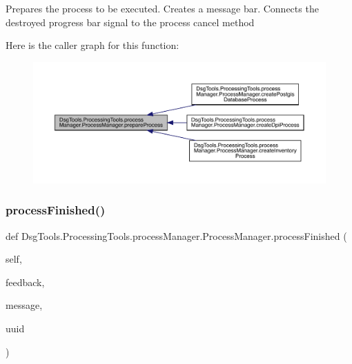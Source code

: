 \begin{DoxyVerb}Prepares the process to be executed.
Creates a message bar.
Connects the destroyed progress bar signal to the process cancel method
\end{DoxyVerb}
 Here is the caller graph for this function\+:
\nopagebreak
\begin{figure}[H]
\begin{center}
\leavevmode
\includegraphics[width=350pt]{class_dsg_tools_1_1_processing_tools_1_1process_manager_1_1_process_manager_a314d0e639c22ed78d70c63a6740a5337_icgraph}
\end{center}
\end{figure}
\mbox{\label{class_dsg_tools_1_1_processing_tools_1_1process_manager_1_1_process_manager_a3054cb26b2103882257b1d2008bec546}} 
\subsubsection{\texorpdfstring{process\+Finished()}{processFinished()}}
{\footnotesize\ttfamily def Dsg\+Tools.\+Processing\+Tools.\+process\+Manager.\+Process\+Manager.\+process\+Finished (\begin{DoxyParamCaption}\item[{}]{self,  }\item[{}]{feedback,  }\item[{}]{message,  }\item[{}]{uuid }\end{DoxyParamCaption})}

